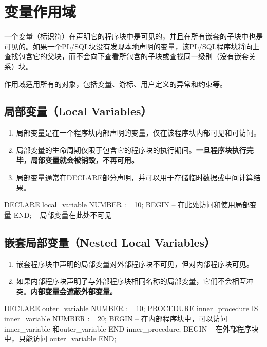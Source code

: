 \documentclass[11pt, a4paper, oneside, UTF8]{ctexbook}
\let\kaishu\relax %
\begin{document}
\section{变量作用域}
一个变量（标识符）在声明它的程序块中是可见的，并且在所有嵌套的子块中也是可见的。如果一个PL/SQL块没有发现本地声明的变量，该PL/SQL程序块将向上查找包含它的父块，而不会向下查看所包含的子块或查找同一级别（没有嵌套关系）块。

作用域适用所有的对象，包括变量、游标、用户定义的异常和约束等。

\subsection{局部变量（Local Variables）}
\begin{enumerate}
  \item 局部变量是在一个程序块内部声明的变量，仅在该程序块内部可见和可访问。
  \item 局部变量的生命周期仅限于包含它的程序块的执行期间。\textbf{一旦程序块执行完毕，局部变量就会被销毁，不再可用。}
  \item 局部变量通常在DECLARE部分声明，并可以用于存储临时数据或中间计算结果。
\end{enumerate}

\begin{plsql}[caption=局部变量作用域示例]
DECLARE
  local_variable NUMBER := 10;
BEGIN
  -- 在此处访问和使用局部变量
END;
-- 局部变量在此处不可见
\end{plsql}

\subsection{嵌套局部变量（Nested Local Variables）}
\begin{enumerate}
  \item 嵌套程序块中声明的局部变量对外部程序块不可见，但对内部程序块可见。
  \item 如果内部程序块声明了与外部程序块相同名称的局部变量，它们不会相互冲突。{\bfseries\kaishu 内部变量会遮蔽外部变量。}
\end{enumerate}

\begin{plsql}[caption=嵌套局部变量作用域示例]
DECLARE
  outer_variable NUMBER := 10;
  PROCEDURE inner_procedure IS
    inner_variable NUMBER := 20;
  BEGIN
    -- 在内部程序块中，可以访问 inner_variable 和outer_variable
  END inner_procedure;
BEGIN
  -- 在外部程序块中，只能访问 outer_variable
END;
\end{plsql}
\end{document}

